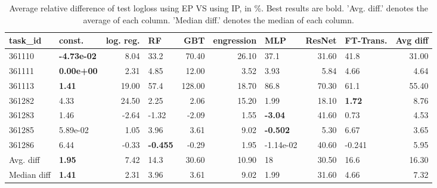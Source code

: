 \begin{table}[ht!]
\centering
\begingroup\footnotesize
\begin{tabular}{llrlrrlrlr}
  \hline
\hline
task\_id & const. & log. reg. & RF & GBT & engression & MLP & ResNet & FT-Trans. & Avg diff \\ 
  \hline
361110 & \textbf{-4.73e-02} & 8.04 & 33.2 & 70.40 & 26.10 & 37.1 & 31.60 & 41.8 & 31.00 \\ 
  361111 & \textbf{ 0.00e+00} & 2.31 & 4.85 & 12.00 & 3.52 & 3.93 & 5.84 & 4.66 & 4.64 \\ 
  361113 & \textbf{1.41} & 19.00 & 57.4 & 128.00 & 18.70 & 86.8 & 70.30 & 61.1 & 55.40 \\ 
  361282 & 4.33 & 24.50 & 2.25 & 2.06 & 15.20 & 1.99 & 18.10 & \textbf{1.72} & 8.76 \\ 
  361283 & 1.46 & -2.64 & -1.32 & -2.09 & 1.55 & \textbf{-3.04} & 41.60 & 0.73 & 4.53 \\ 
  361285 &  5.89e-02 & 1.05 & 3.96 & 3.61 & 9.02 & \textbf{-0.502} & 5.30 & 6.67 & 3.65 \\ 
  361286 & 6.44 & -0.33 & \textbf{-0.455} & -0.29 & 1.95 & -1.14e-02 & 40.60 & -0.241 & 5.95 \\ 
   \hline
Avg. diff & \textbf{1.95} & 7.42 & 14.3 & 30.60 & 10.90 & 18 & 30.50 & 16.6 & 16.30 \\ 
  Median diff & \textbf{1.41} & 2.31 & 3.96 & 3.61 & 9.02 & 1.99 & 31.60 & 4.66 & 7.32 \\ 
   \hline
\hline
\end{tabular}
\endgroup
\caption{Average relative difference of test logloss using EP VS using IP, in \%. 
                  Best results are bold. 
                  'Avg. diff.' denotes the average of each column.
                  'Median diff.' denotes the median of each column.} 
\label{TABLES/table_results_logloss_umap_num_and_cat_features_EP_VS_IP}
\end{table}
